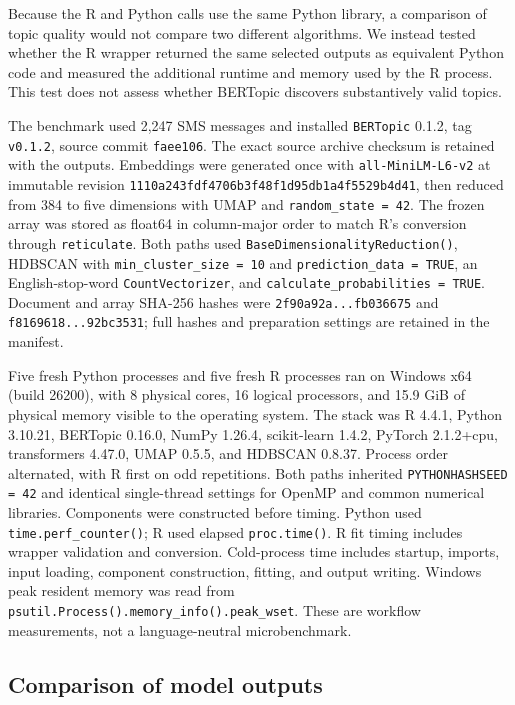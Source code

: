 \documentclass[12pt]{article}
\newcommand{\pkg}[1]{\texttt{#1}}
\newcommand{\code}[1]{\texttt{#1}}
\newcommand{\fcode}[1]{\nolinkurl{#1}}
\begin{document}
Because the R and Python calls use the same Python library, a comparison of topic quality would not compare two different algorithms. We instead tested whether the R wrapper returned the same selected outputs as equivalent Python code and measured the additional runtime and memory used by the R process. This test does not assess whether BERTopic discovers substantively valid topics.

The benchmark used 2,247 SMS messages and installed \pkg{BERTopic} 0.1.2, tag \fcode{v0.1.2}, source commit \fcode{faee106}. The exact source archive checksum is retained with the outputs. Embeddings were generated once with \fcode{all-MiniLM-L6-v2} at immutable revision \fcode{1110a243fdf4706b3f48f1d95db1a4f5529b4d41}, then reduced from 384 to five dimensions with UMAP and \fcode{random_state = 42}. The frozen array was stored as float64 in column-major order to match R's conversion through \pkg{reticulate}. Both paths used \fcode{BaseDimensionalityReduction()}, HDBSCAN with \fcode{min_cluster_size = 10} and \fcode{prediction_data = TRUE}, an English-stop-word \fcode{CountVectorizer}, and \fcode{calculate_probabilities = TRUE}. Document and array SHA-256 hashes were \fcode{2f90a92a...fb036675} and \fcode{f8169618...92bc3531}; full hashes and preparation settings are retained in the manifest.

Five fresh Python processes and five fresh R processes ran on Windows x64 (build 26200), with 8 physical cores, 16 logical processors, and 15.9 GiB of physical memory visible to the operating system. The stack was R 4.4.1, Python 3.10.21, BERTopic 0.16.0, NumPy 1.26.4, scikit-learn 1.4.2, PyTorch 2.1.2+cpu, transformers 4.47.0, UMAP 0.5.5, and HDBSCAN 0.8.37. Process order alternated, with R first on odd repetitions. Both paths inherited \fcode{PYTHONHASHSEED = 42} and identical single-thread settings for OpenMP and common numerical libraries. Components were constructed before timing. Python used \code{time.perf\_counter()}; R used elapsed \code{proc.time()}. R fit timing includes wrapper validation and conversion. Cold-process time includes startup, imports, input loading, component construction, fitting, and output writing. Windows peak resident memory was read from \fcode{psutil.Process().memory_info().peak_wset}. These are workflow measurements, not a language-neutral microbenchmark.

\subsection{Comparison of model outputs}
\end{document}
